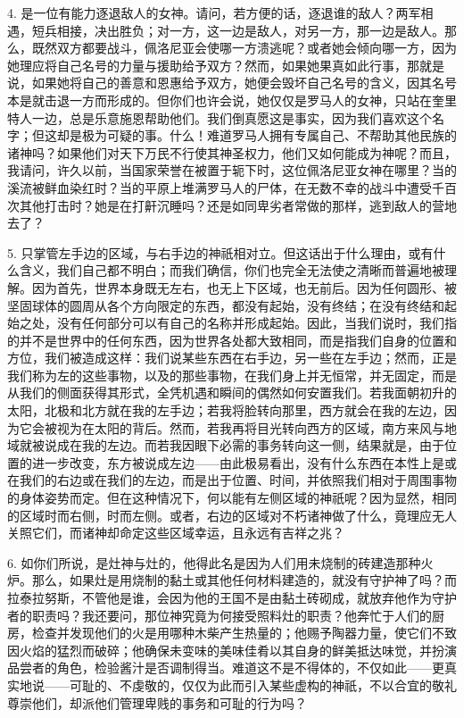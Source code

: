 4. 是一位有能力逐退敌人的女神。请问，若方便的话，逐退谁的敌人？两军相遇，短兵相接，决出胜负；对一方，这一边是敌人，对另一方，那一边是敌人。那么，既然双方都要战斗，佩洛尼亚会使哪一方溃逃呢？或者她会倾向哪一方，因为她理应将自己名号的力量与援助给予双方？然而，如果她果真如此行事，那就是说，如果她将自己的善意和恩惠给予双方，她便会毁坏自己名号的含义，因其名号本是就击退一方而形成的。但你们也许会说，她仅仅是罗马人的女神，只站在奎里特人一边，总是乐意施恩帮助他们。我们倒真愿这是事实，因为我们喜欢这个名字；但这却是极为可疑的事。什么！难道罗马人拥有专属自己、不帮助其他民族的诸神吗？如果他们对天下万民不行使其神圣权力，他们又如何能成为神呢？而且，我请问，许久以前，当国家荣誉在被置于轭下时，这位佩洛尼亚女神在哪里？当的溪流被鲜血染红时？当的平原上堆满罗马人的尸体，在无数不幸的战斗中遭受千百次其他打击时？她是在打鼾沉睡吗？还是如同卑劣者常做的那样，逃到敌人的营地去了？\par

5. 只掌管左手边的区域，与右手边的神祇相对立。但这话出于什么理由，或有什么含义，我们自己都不明白；而我们确信，你们也完全无法使之清晰而普遍地被理解。因为首先，世界本身既无左右，也无上下区域，也无前后。因为任何圆形、被坚固球体的圆周从各个方向限定的东西，都没有起始，没有终结；在没有终结和起始之处，没有任何部分可以有自己的名称并形成起始。因此，当我们说时，我们指的并不是世界中的任何东西，因为世界各处都大致相同，而是指我们自身的位置和方位，我们被造成这样：我们说某些东西在右手边，另一些在左手边；然而，正是我们称为左的这些事物，以及的那些事物，在我们身上并无恒常，并无固定，而是从我们的侧面获得其形式，全凭机遇和瞬间的偶然如何安置我们。若我面朝初升的太阳，北极和北方就在我的左手边；若我将脸转向那里，西方就会在我的左边，因为它会被视为在太阳的背后。然而，若我再将目光转向西方的区域，南方来风与地域就被说成在我的左边。而若我因眼下必需的事务转向这一侧，结果就是，由于位置的进一步改变，东方被说成左边——由此极易看出，没有什么东西在本性上是或在我们的右边或在我们的左边，而是出于位置、时间，并依照我们相对于周围事物的身体姿势而定。但在这种情况下，何以能有左侧区域的神祇呢？因为显然，相同的区域时而右侧，时而左侧。或者，右边的区域对不朽诸神做了什么，竟理应无人关照它们，而诸神却命定这些区域幸运，且永远有吉祥之兆？\par

6. 如你们所说，是灶神与灶的，他得此名是因为人们用未烧制的砖建造那种火炉。那么，如果灶是用烧制的黏土或其他任何材料建造的，就没有守护神了吗？而拉泰拉努斯，不管他是谁，会因为他的王国不是由黏土砖砌成，就放弃他作为守护者的职责吗？我还要问，那位神究竟为何接受照料灶的职责？他奔忙于人们的厨房，检查并发现他们的火是用哪种木柴产生热量的；他赐予陶器力量，使它们不致因火焰的猛烈而破碎；他确保未变味的美味佳肴以其自身的鲜美抵达味觉，并扮演品尝者的角色，检验酱汁是否调制得当。难道这不是不得体的，不仅如此——更真实地说——可耻的、不虔敬的，仅仅为此而引入某些虚构的神祇，不以合宜的敬礼尊崇他们，却派他们管理卑贱的事务和可耻的行为吗？\par

